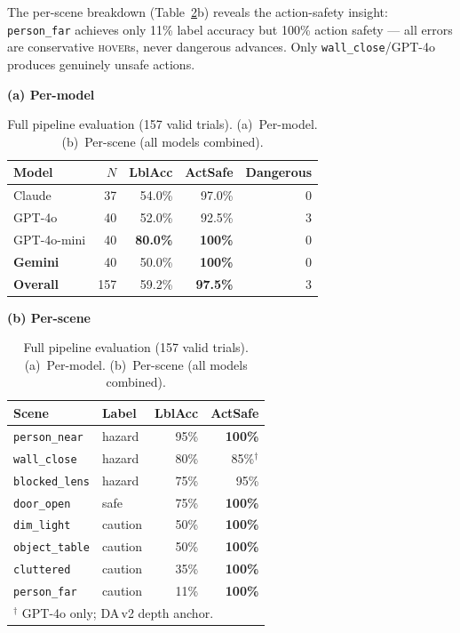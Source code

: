 \documentclass[journal]{IEEEtran}
\begin{document}
The per-scene breakdown (Table~\ref{tab:g5}b) reveals the
action-safety insight: \texttt{person\_far} achieves only 11\%
label accuracy but 100\% action safety --- all errors are
conservative \textsc{hover}s, never dangerous advances.
Only \texttt{wall\_close}/GPT-4o produces genuinely unsafe actions.

\begin{table}[t]
  \caption{Full pipeline evaluation (157 valid trials).
    (a)~Per-model. (b)~Per-scene (all models combined).}
  \label{tab:g5}
  \centering
  \small
  \textbf{(a) Per-model}\vspace{2pt}\\
  \begin{tabular}{lrrrr}
    \toprule
    Model & $N$ & LblAcc & ActSafe & Dangerous \\
    \midrule
    Claude              & 37  & 54.0\% & 97.0\%          & 0 \\
    GPT-4o              & 40  & 52.0\% & 92.5\%          & 3 \\
    GPT-4o-mini         & 40  & \textbf{80.0\%} & \textbf{100\%} & 0 \\
    \textbf{Gemini}     & 40  & 50.0\% & \textbf{100\%}  & 0 \\
    \midrule
    \textbf{Overall}    & 157 & 59.2\% & \textbf{97.5\%} & 3 \\
    \bottomrule
  \end{tabular}
  \vspace{4pt}

  \textbf{(b) Per-scene}\vspace{2pt}\\
  \begin{tabular}{llrr}
    \toprule
    Scene & Label & LblAcc & ActSafe \\
    \midrule
    \texttt{person\_near}  & hazard  & 95\% & \textbf{100\%} \\
    \texttt{wall\_close}   & hazard  & 80\% & 85\%$^\dagger$ \\
    \texttt{blocked\_lens} & hazard  & 75\% & 95\% \\
    \texttt{door\_open}    & safe    & 75\% & \textbf{100\%} \\
    \texttt{dim\_light}    & caution & 50\% & \textbf{100\%} \\
    \texttt{object\_table} & caution & 50\% & \textbf{100\%} \\
    \texttt{cluttered}     & caution & 35\% & \textbf{100\%} \\
    \texttt{person\_far}   & caution & 11\% & \textbf{100\%} \\
    \bottomrule
    \multicolumn{4}{l}{$^\dagger$ GPT-4o only; DA\,v2 depth anchor.}
  \end{tabular}
\end{table}
\end{document}
